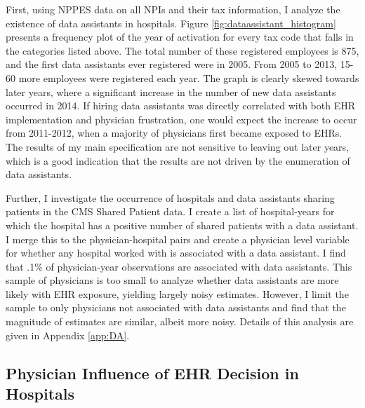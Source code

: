 \documentclass[11pt]{article}
\begin{document}
First, using NPPES data on all NPIs and their tax information, I analyze the existence of data assistants in hospitals. Figure \ref{fig:dataassistant_histogram} presents a frequency plot of the year of activation for every tax code that falls in the categories listed above. The total number of these registered employees is 875, and the first data assistants ever registered were in 2005. From 2005 to 2013, 15-60 more employees were registered each year. The graph is clearly skewed towards later years, where a significant increase in the number of new data assistants occurred in 2014. If hiring data assistants was directly correlated with both EHR implementation and physician frustration, one would expect the increase to occur from 2011-2012, when a majority of physicians first became exposed to EHRs. The results of my main specification are not sensitive to leaving out later years, which is a good indication that the results are not driven by the enumeration of data assistants. 

Further, I investigate the occurrence of hospitals and data assistants sharing patients in the CMS Shared Patient data. I create a list of hospital-years for which the hospital has a positive number of shared patients with a data assistant. I merge this to the physician-hospital pairs and create a physician level variable for whether any hospital worked with is associated with a data assistant. I find that .1\% of physician-year observations are associated with data assistants. This sample of physicians is too small to analyze whether data assistants are more likely with EHR exposure, yielding largely noisy estimates. However, I limit the sample to only physicians not associated with data assistants and find that the magnitude of estimates are similar, albeit more noisy. Details of this analysis are given in Appendix \ref{app:DA}. 



\subsection{Physician Influence of EHR Decision in Hospitals}
\end{document}
